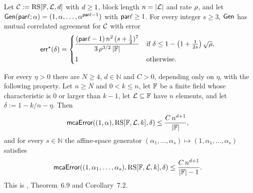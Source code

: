 \begin{theorem}\label{thm:mca_rs_johnson}
\leanok
{}
    Let $\mathcal{C} := \mathrm{RS}[\mathbb{F}, \mathcal{L}, d]$ with $d\ge1$, block length
    $n=|\mathcal{L}|$ and rate $\rho$, and let
    $\mathsf{Gen}(\mathsf{par}\ell;\alpha)=(1,\alpha,\ldots,\alpha^{\mathsf{par}\ell-1})$ with $\mathsf{par}\ell\ge1$. For every integer
    $s\ge3$, $\mathsf{Gen}$ has mutual correlated agreement for $\mathcal{C}$ with error
    \[
      \mathsf{err}^\star(\delta)=
      \begin{cases}
        \dfrac{(\mathsf{par}\ell-1)\, n^2\,(s+\frac12)^7}{3\,\rho^{3/2}\,|\mathbb{F}|}
          & \text{if } \delta\le 1-\left(1+\frac{1}{2s}\right)\sqrt{\rho},\\[8pt]
        1 & \text{otherwise.}
      \end{cases}
    \]
\end{theorem}

\begin{theorem}\label{thm:mca_rs_capacity}
\leanok
{}
    For every $\eta>0$ there are $N\ge4$, $d\in\mathbb{N}$ and $C>0$, depending only on $\eta$,
    with the following property. Let $n\ge N$ and $0<k\le n$, let $\mathbb{F}$ be a finite field
    whose characteristic is $0$ or larger than $k-1$, let $\mathcal{L}\subseteq\mathbb{F}$ have $n$
    elements, and let $\delta:=1-k/n-\eta$. Then
    \[
      \mathsf{mcaError}((1,\alpha),\mathrm{RS}[\mathbb{F},\mathcal{L},k],\delta)\le
        \frac{C\,n^{d+1}}{|\mathbb{F}|},
    \]
    and for every $s\in\mathbb{N}$ the affine-space generator
    $(\alpha_1,\ldots,\alpha_s)\mapsto(1,\alpha_1,\ldots,\alpha_s)$ satisfies
    \[
      \mathsf{mcaError}((1,\alpha_1,\ldots,\alpha_s),\mathrm{RS}[\mathbb{F},\mathcal{L},k],\delta)\le
        \frac{C\,n^{d+1}}{|\mathbb{F}|-1}.
    \]
    This is \cite{DKT26}, Theorem~6.9 and Corollary~7.2.
\end{theorem}

